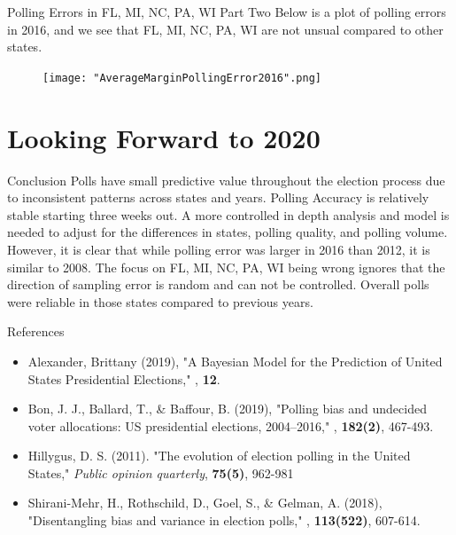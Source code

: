 \documentclass{beamer}\usepackage[]{graphicx}\usepackage[]{color}
\begin{document}
\begin{frame}{Polling Errors in FL, MI, NC, PA, WI Part Two}
Below is a plot of polling errors in 2016, and we see that FL, MI, NC, PA, WI are not unsual compared to other states. %
\begin{figure}[h]
       \centering
        \texttt{[image: "AverageMarginPollingError2016".png]}
    \end{figure}
\end{frame}


\section{Looking Forward to 2020}
\begin{frame}{Conclusion}
Polls have small predictive value throughout the election process due to inconsistent patterns across states and years. Polling Accuracy is relatively stable starting three weeks out.  A more controlled in depth analysis and model is needed to adjust for the differences in states, polling quality, and polling volume. However, it is clear that while polling error was larger in 2016 than 2012, it is similar to 2008.  The focus on FL, MI, NC, PA, WI being wrong ignores that the direction of sampling error is random and can not be controlled. Overall polls were reliable in those states compared to previous years.
\end{frame}

\begin{frame}{References}
\begin{itemize}
\item Alexander, Brittany (2019), "A Bayesian Model for the Prediction of United States Presidential Elections," , \textbf{12}. 
\item Bon, J. J., Ballard, T., \& Baffour, B. (2019), "Polling bias and undecided voter allocations: US presidential elections, 2004–2016," , \textbf{182(2)}, 467-493.
\item Hillygus, D. S. (2011). "The evolution of election polling in the United States," \textit{Public opinion quarterly}, \textbf{75(5)}, 962-981
\item Shirani-Mehr, H., Rothschild, D., Goel, S., \& Gelman, A. (2018), "Disentangling bias and variance in election polls," , \textbf{113(522)}, 607-614.
\end{itemize}
\end{frame}
\end{document}

